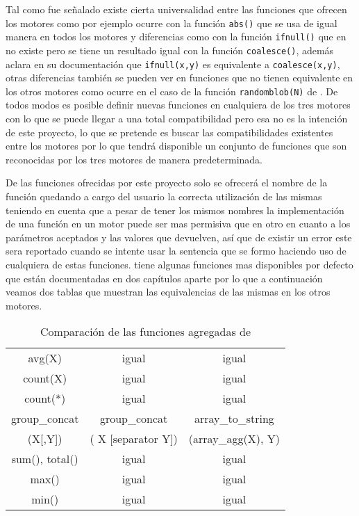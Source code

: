 Tal como fue señalado existe cierta universalidad entre las funciones que ofrecen los motores como por ejemplo ocurre con la función \verb=abs()= que se usa de igual manera en todos los motores y diferencias como con la función \verb=ifnull()= que en \p no existe pero se tiene un resultado igual con la función \verb=coalesce()=, además \s aclara en su documentación que \verb=ifnull(x,y)= es equivalente a \verb=coalesce(x,y)=, otras diferencias también se pueden ver en funciones que no tienen equivalente en los otros motores como ocurre en el caso de la función \verb=randomblob(N)= de \s. De todos modos es posible definir nuevas funciones en cualquiera de los tres motores con lo que se puede llegar a una total compatibilidad pero esa no es la intención de este proyecto, lo que se pretende es buscar las compatibilidades existentes entre los motores por lo que \jj tendrá disponible un conjunto de funciones que son reconocidas por los tres motores de manera predeterminada.

De las funciones ofrecidas por este proyecto solo se ofrecerá el nombre de la función quedando a cargo del usuario la correcta utilización de las mismas teniendo en cuenta que a pesar de tener los mismos nombres la implementación de una función en un motor puede ser mas permisiva que en otro en cuanto a los parámetros aceptados y las valores que devuelven, así que de existir un error este sera reportado cuando se intente usar la sentencia que se formo haciendo uso de cualquiera de estas funciones. \s tiene algunas funciones mas disponibles por defecto que están documentadas en dos capítulos aparte por lo que a continuación veamos dos tablas que muestran las equivalencias de las mismas en los otros motores.

\begin{table}[h]
\begin{center}
{
\selectfont
\begin{tabular}{|c|c|c|}
\hline 
\s & \m & \p \\ 
\hline 
avg(X) & igual & igual \\ 
\hline 
count(X) & igual & igual \\ 
\hline 
count(*) & igual & igual \\ 
\hline 
group\_concat & group\_concat & array\_to\_string \\ 
(X[,Y]) & ( X [separator Y]) & (array\_agg(X), Y) \\
\hline 
sum(), total() & igual & igual \\ 
\hline 
max() & igual & igual \\ 
\hline 
min() & igual & igual \\ 
\hline 
\end{tabular} 
}
\end{center}
\caption{Comparación de las funciones agregadas de \s}
\end{table}  

